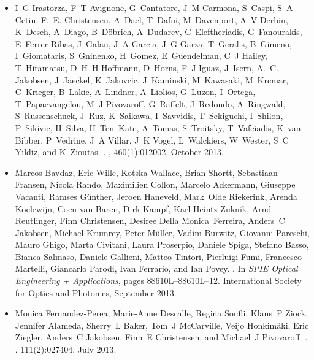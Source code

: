\begin{itemize}
\item
I~G Irastorza, F~T Avignone, G~Cantatore, J~M Carmona, S~Caspi, S~A Cetin,
  F.~E. Christensen, A~Dael, T~Dafni, M~Davenport, A~V Derbin, K~Desch,
  A~Diago, B~D{\"o}brich, A~Dudarev, C~Eleftheriadis, G~Fanourakis,
  E~Ferrer-Ribas, J~Galan, J~A Garcia, J~G Garza, T~Geralis, B~Gimeno,
  I~Giomataris, S~Gninenko, H~Gomez, E~Guendelman, C~J Hailey, T~Hiramatsu,
  D~H~H Hoffmann, D~Horns, F~J Iguaz, J~Isern, A.~C. Jakobsen, J~Jaeckel,
  K~Jakovcic, J~Kaminski, M~Kawasaki, M~Krcmar, C~Krieger, B~Lakic, A~Lindner,
  A~Liolios, G~Luzon, I~Ortega, T~Papaevangelou, M~J Pivovaroff, G~Raffelt,
  J~Redondo, A~Ringwald, S~Russenschuck, J~Ruz, K~Saikawa, I~Savvidis,
  T~Sekiguchi, I~Shilon, P~Sikivie, H~Silva, H~Ten~Kate, A~Tomas, S~Troitsky,
  T~Vafeiadis, K~van Bibber, P~Vedrine, J~A Villar, J~K Vogel, L~Walckiers,
  W~Wester, S~C Yildiz, and K~Zioutas.
.
, 460(1):012002, October
  2013.

\item
Marcos Bavdaz, Eric Wille, Kotska Wallace, Brian Shortt, Sebastiaan Fransen,
  Nicola Rando, Maximilien Collon, Marcelo Ackermann, Giuseppe Vacanti, Ramses
  G{\"u}nther, Jeroen Haneveld, Mark~Olde Riekerink, Arenda Koelewijn, Coen van
  Baren, Dirk Kampf, Karl-Heintz Zuknik, Arnd Reutlinger, Finn Christensen,
  Desiree Della Monica~Ferreira, Anders~C Jakobsen, Michael Krumrey, Peter
  M{\"u}ller, Vadim Burwitz, Giovanni Pareschi, Mauro Ghigo, Marta Civitani,
  Laura Proserpio, Daniele Spiga, Stefano Basso, Bianca Salmaso, Daniele
  Gallieni, Matteo Tintori, Pierluigi Fumi, Francesco Martelli, Giancarlo
  Parodi, Ivan Ferrario, and Ian Povey.
.
\newblock In {\em SPIE Optical Engineering + Applications}, pages
  88610L--88610L--12. International Society for Optics and Photonics, September
  2013.

\item
Monica Fernandez-Perea, Marie-Anne Descalle, Regina Soufli, Klaus~P Ziock,
  Jennifer Alameda, Sherry~L Baker, Tom~J McCarville, Veijo Honkim{\"a}ki, Eric
  Ziegler, Anders~C Jakobsen, Finn~E Christensen, and Michael~J Pivovaroff.
.
, 111(2):027404, July 2013.


\end{itemize}
